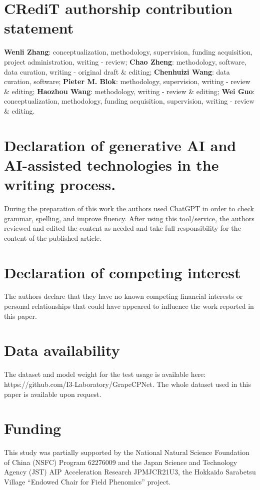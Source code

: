 \documentclass[12pt]{article}
\begin{document}
\section*{CRediT authorship contribution statement}
\textbf{Wenli Zhang}: conceptualization, methodology, supervision, funding acquisition, project administration, writing - review; \textbf{Chao Zheng}: methodology, software, data curation, writing - original draft \& editing; \textbf{Chenhuizi Wang}: data curation, software; \textbf{Pieter M. Blok}: methodology, supervision, writing - review \& editing; \textbf{Haozhou Wang}: methodology, writing - review \& editing; \textbf{Wei Guo}: conceptualization, methodology, funding acquisition, supervision, writing - review \& editing.

\section*{Declaration of generative AI and AI-assisted technologies in the writing process.}
During the preparation of this work the authors used ChatGPT in order to check grammar, spelling, and improve fluency. After using this tool/service, the authors reviewed and edited the content as needed and take full responsibility for the content of the published article.

\section*{Declaration of competing interest}
The authors declare that they have no known competing financial interests or personal relationships that could have appeared to influence the work reported in this paper.

\section*{Data availability}
The dataset and model weight for the test usage is available here: https://github.com/I3-Laboratory/GrapeCPNet. The whole dataset used in this paper is available upon request.

\section*{Funding}
This study was partially supported by the National Natural Science Foundation of China (NSFC) Program 62276009 and the Japan Science and Technology Agency (JST) AIP Acceleration Research JPMJCR21U3, the Hokkaido Sarabetsu Village ``Endowed Chair for Field Phenomics'' project.

{\clearpage}



\end{document}
